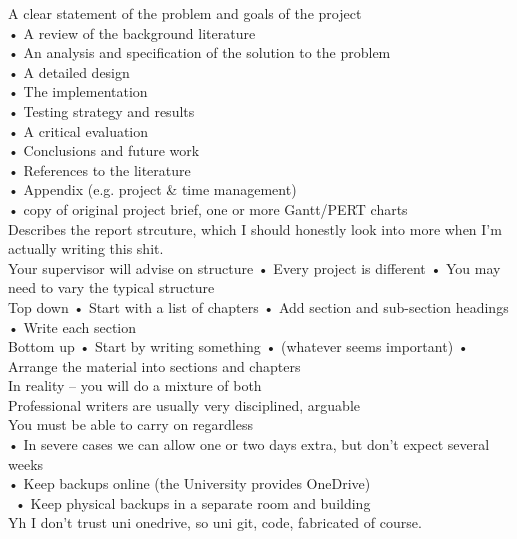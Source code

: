 \documentclass [12pt]{article}
\begin{document}
A clear statement of the problem and goals of the project\\
• A review of the background literature\\
• An analysis and specification of the solution to the problem\\
• A detailed design\\
• The implementation\\
• Testing strategy and results\\
• A critical evaluation\\
• Conclusions and future work\\
• References to the literature\\
• Appendix (e.g. project \& time management)\\
• copy of original project brief, one or more Gantt/PERT charts\\

Describes the report strcuture, which I should honestly look into more when I'm actually writing this shit.\\ 



Your supervisor will advise on structure
• Every project is different
• You may need to vary the typical structure\\



Top down
• Start with a list of chapters
• Add section and sub-section headings
• Write each section\\



Bottom up
• Start by writing something
• (whatever seems important)
• Arrange the material into sections and chapters\\

In reality – you will do a mixture of both\\

Professional writers are usually very disciplined, arguable\\



You must be able to carry on regardless\\
• In severe cases we can allow one or two days extra, but don’t expect several weeks\\
• Keep backups online (the University provides OneDrive)\\\
• Keep physical backups in a separate room and building\\

Yh I don't trust uni onedrive, so uni git, code, fabricated of course.\\ 
\end{document}
